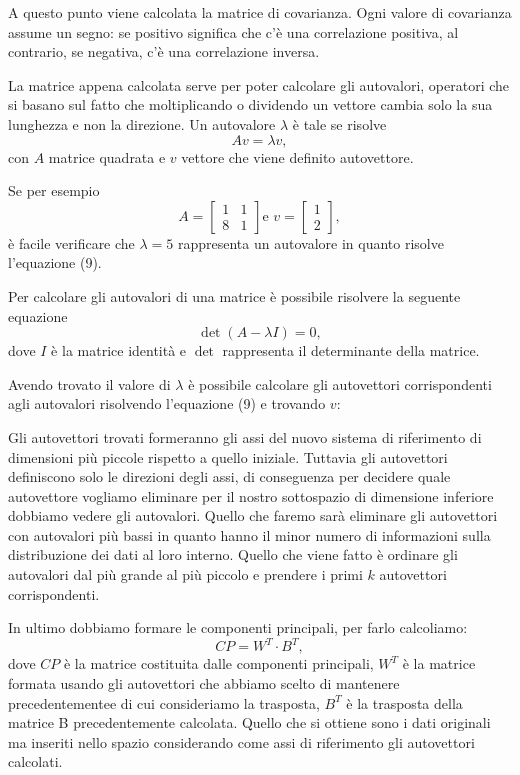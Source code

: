 \documentclass[12pt,italian]{report}
\begin{document}
A questo punto viene calcolata la matrice di covarianza. Ogni valore di covarianza assume un segno: se positivo significa che c'è una correlazione positiva, al contrario, se negativa, c'è una correlazione inversa.

La matrice appena calcolata serve per poter calcolare gli autovalori, operatori che si basano sul fatto che moltiplicando o dividendo un vettore cambia solo la sua lunghezza e non la direzione. Un autovalore $\lambda$ è tale se risolve 
\begin{equation}
Av = \lambda v,
\end{equation}
con $A$ matrice quadrata e $v$ vettore che viene definito autovettore. 

Se per esempio
\begin{equation}
A=\left[\begin{matrix}
1&1\\8&1
\end{matrix}\right]
\text{e } v=\left[\begin{matrix}
1\\2
\end{matrix}\right],
\end{equation}
è facile verificare che $\lambda = 5$ rappresenta un autovalore in quanto risolve l'equazione (9).

Per calcolare gli autovalori di una matrice è possibile risolvere la seguente equazione
\begin{equation}
\det(A - \lambda I) = 0,
\end{equation}
dove $I$ è la matrice identità e $\det$ rappresenta il determinante della matrice.

Avendo trovato il valore di $\lambda$ è possibile calcolare gli autovettori corrispondenti agli autovalori risolvendo l'equazione (9) e trovando $v$:

Gli autovettori trovati formeranno gli assi del nuovo sistema di riferimento di dimensioni più piccole rispetto a quello iniziale. Tuttavia gli autovettori definiscono solo le direzioni degli assi, di conseguenza per decidere quale autovettore vogliamo eliminare per il nostro sottospazio di dimensione inferiore dobbiamo vedere gli autovalori. Quello che faremo sarà eliminare gli autovettori con autovalori più bassi in quanto hanno il minor numero di informazioni sulla distribuzione dei dati al loro interno. Quello che viene fatto è ordinare gli autovalori dal più grande al più piccolo e prendere i primi $k$ autovettori corrispondenti.

In ultimo dobbiamo formare le componenti principali, per farlo calcoliamo:
\begin{equation}
CP = W^{T} \cdot B^{T},
\end{equation}
dove $CP$ è la matrice costituita dalle componenti principali, $W^{T}$ è la matrice formata usando gli autovettori che abbiamo scelto di mantenere precedentementee di cui consideriamo la trasposta, $B^{T}$ è la trasposta della matrice B precedentemente calcolata.
Quello che si ottiene sono i dati originali ma inseriti nello spazio considerando come assi di riferimento gli autovettori calcolati.
\end{document}
